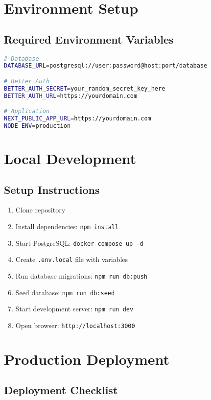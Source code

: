 \documentclass[12pt,a4paper]{report}
\begin{document}
\section{Environment Setup}

\subsection{Required Environment Variables}

\begin{lstlisting}[language=bash]
# Database
DATABASE_URL=postgresql://user:password@host:port/database

# Better Auth
BETTER_AUTH_SECRET=your_random_secret_key_here
BETTER_AUTH_URL=https://yourdomain.com

# Application
NEXT_PUBLIC_APP_URL=https://yourdomain.com
NODE_ENV=production
\end{lstlisting}

\section{Local Development}

\subsection{Setup Instructions}

\begin{enumerate}
    \item Clone repository
    \item Install dependencies: \texttt{npm install}
    \item Start PostgreSQL: \texttt{docker-compose up -d}
    \item Create \texttt{.env.local} file with variables
    \item Run database migrations: \texttt{npm run db:push}
    \item Seed database: \texttt{npm run db:seed}
    \item Start development server: \texttt{npm run dev}
    \item Open browser: \texttt{http://localhost:3000}
\end{enumerate}

\section{Production Deployment}

\subsection{Deployment Checklist}
\end{document}
